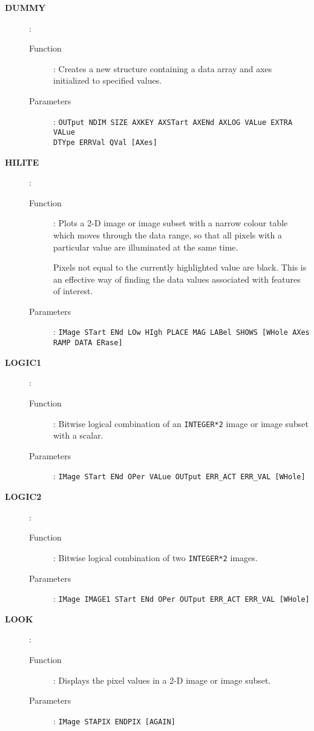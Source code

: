 \begin{description}
\newpage

\item[\large\bf DUMMY]:
   \begin{description}
   \item[Function]:
      Creates a new structure containing a data array and axes initialized to
         specified values.
   \item[Parameters]:
      {\tt OUTput NDIM SIZE AXKEY AXSTart AXENd AXLOG VALue EXTRA VALue\\
      DTYpe ERRVal QVal [AXes]}
   \end{description}

\item[\large\bf HILITE]:
   \begin{description}
   \item[Function]:
      Plots a 2-D image or image subset with a narrow colour table which moves
      through the data range, so that all pixels with a particular value are
      illuminated at the same time.

      Pixels not equal to the currently highlighted value are black. This is
      an effective way of finding the data values associated with features of
      interest.
   \item[Parameters]:
      {\tt IMage STart ENd LOw HIgh PLACE MAG LABel SHOWS [WHole AXes\\
      RAMP DATA ERase]}
   \end{description}

\item[\large\bf LOGIC1]:
   \begin{description}
   \item[Function]:
      Bitwise logical combination of an {\tt INTEGER*2} image or image subset
      with a scalar.
   \item[Parameters]:
      {\tt IMage STart ENd OPer VALue OUTput ERR\_ACT ERR\_VAL [WHole]}
   \end{description}

\item[\large\bf LOGIC2]:
   \begin{description}
   \item[Function]:
      Bitwise logical combination of two {\tt INTEGER*2} images.
   \item[Parameters]:
      {\tt IMage IMAGE1 STart ENd OPer OUTput ERR\_ACT ERR\_VAL [WHole]}
   \end{description}

\item[\large\bf LOOK]:
   \begin{description}
   \item[Function]:
      Displays the pixel values in a 2-D image or image subset.
   \item[Parameters]:
      {\tt IMage STAPIX ENDPIX [AGAIN]}
   \end{description}


\end{description}
